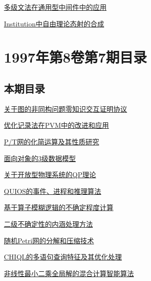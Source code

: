 \documentclass[a4paper]{article}
\begin{document}
\href{http://www.jos.org.cn/ch/reader/download_pdf.aspx?file_no=19970811&year_id=1997&quarter_id=8&falg=1}{多级文法在通用型中间件中的应用}

\href{http://www.jos.org.cn/ch/reader/download_pdf.aspx?file_no=19970812&year_id=1997&quarter_id=8&falg=1}{Institution中自由理论态射的合成}


\section{\textbf{1997年第8卷第7期目录}}
\subsection{本期目录}
\href{http://www.jos.org.cn/ch/reader/download_pdf.aspx?file_no=19970701&year_id=1997&quarter_id=7&falg=1}{关于图的非同构问题零知识交互证明协议}

\href{http://www.jos.org.cn/ch/reader/download_pdf.aspx?file_no=19970702&year_id=1997&quarter_id=7&falg=1}{优化记录法在PVM中的改进和应用}

\href{http://www.jos.org.cn/ch/reader/download_pdf.aspx?file_no=19970703&year_id=1997&quarter_id=7&falg=1}{P/T网的化简运算及其性质研究}

\href{http://www.jos.org.cn/ch/reader/download_pdf.aspx?file_no=19970704&year_id=1997&quarter_id=7&falg=1}{面向对象的3级数据模型}

\href{http://www.jos.org.cn/ch/reader/download_pdf.aspx?file_no=19970705&year_id=1997&quarter_id=7&falg=1}{关于开放型物理系统的QP理论}

\href{http://www.jos.org.cn/ch/reader/download_pdf.aspx?file_no=19970706&year_id=1997&quarter_id=7&falg=1}{QUIOS的事件、进程和推理算法}

\href{http://www.jos.org.cn/ch/reader/download_pdf.aspx?file_no=19970707&year_id=1997&quarter_id=7&falg=1}{基于算子模糊逻辑的不确定程度计算}

\href{http://www.jos.org.cn/ch/reader/download_pdf.aspx?file_no=19970708&year_id=1997&quarter_id=7&falg=1}{二级不确定性的内涵处理方法}

\href{http://www.jos.org.cn/ch/reader/download_pdf.aspx?file_no=19970709&year_id=1997&quarter_id=7&falg=1}{随机Petri网的分解和压缩技术}

\href{http://www.jos.org.cn/ch/reader/download_pdf.aspx?file_no=19970710&year_id=1997&quarter_id=7&falg=1}{CHIQL的多语句查询特征及其优化处理}

\href{http://www.jos.org.cn/ch/reader/download_pdf.aspx?file_no=19970711&year_id=1997&quarter_id=7&falg=1}{非线性最小二乘全局解的混合计算智能算法}
\end{document}
